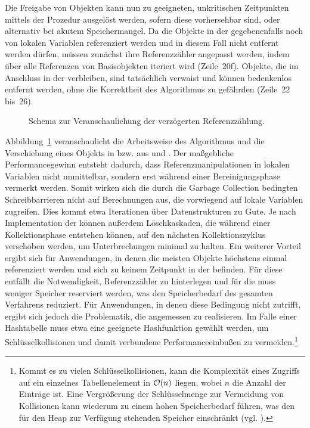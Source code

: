 Die Freigabe von Objekten kann nun zu geeigneten, unkritischen Zeitpunkten mittels der Prozedur  ausgelöst werden, sofern diese vorhersehbar sind, oder alternativ bei akutem Speichermangel.
Da die Objekte in der  gegebenenfalls noch von lokalen Variablen referenziert werden und in diesem Fall nicht entfernt werden dürfen, müssen zunächst ihre Referenzzähler angepasst werden, indem über alle Referenzen von Basisobjekten iteriert wird (Zeile~20f).
Objekte, die im Anschluss in der  verbleiben, sind tatsächlich verwaist und können bedenkenlos entfernt werden, ohne die Korrektheit des Algorithmus zu gefährden (Zeile~22 bis~26).

\begin{figure}[h]
	\centering
	
	\caption[Veranschaulichung der verzögerten Referenzzählung]{Schema zur Veranschaulichung der verzögerten Referenzzählung.}
	\label{fig:rc-deferred}
\end{figure}

Abbildung~\ref{fig:rc-deferred} veranschaulicht die Arbeitsweise des Algorithmus und die Verschiebung eines Objekts  in bzw. aus  und .
Der maßgebliche Performancegewinn entsteht dadurch, dass Referenzmanipulationen in lokalen Variablen nicht unmittelbar, sondern erst während einer Bereinigungsphase vermerkt werden.
Somit wirken sich die durch die Garbage Collection bedingten Schreibbarrieren nicht auf Berechnungen aus, die vorwiegend auf lokale Variablen zugreifen.
Dies kommt etwa Iterationen über Datenstrukturen zu Gute.
Je nach Implementation der  können außerdem Löschkaskaden, die während einer Kollektionsphase entstehen können, auf den nächsten Kollektionszyklus verschoben werden, um Unterbrechungen minimal zu halten. 
Ein weiterer Vorteil ergibt sich für Anwendungen, in denen die meisten Objekte höchstens einmal referenziert werden und sich zu keinem Zeitpunkt in der  befinden.
Für diese entfällt die Notwendigkeit, Referenzzähler zu hinterlegen und für die  muss weniger Speicher reserviert werden, was den Speicherbedarf des gesamten Verfahrens reduziert.
Für Anwendungen, in denen diese Bedingung nicht zutrifft, ergibt sich jedoch die Problematik, die  angemessen zu realisieren.
Im Falle einer Hashtabelle muss etwa eine geeignete Hashfunktion gewählt werden, um Schlüsselkollisionen und damit verbundene Performanceeinbußen zu vermeiden.\footnote{Kommt es zu vielen Schlüsselkollisionen, kann die Komplexität eines Zugriffs auf ein einzelnes Tabellenelement in $\mathcal{O}(n)$ liegen, wobei $n$ die Anzahl der Einträge ist. Eine Vergrößerung der Schlüsselmenge zur Vermeidung von Kollisionen kann wiederum zu einem hohen Speicherbedarf führen, was den für den Heap zur Verfügung stehenden Speicher einschränkt (vgl. \cite[S. 253]{cormen-leiserson}).}

